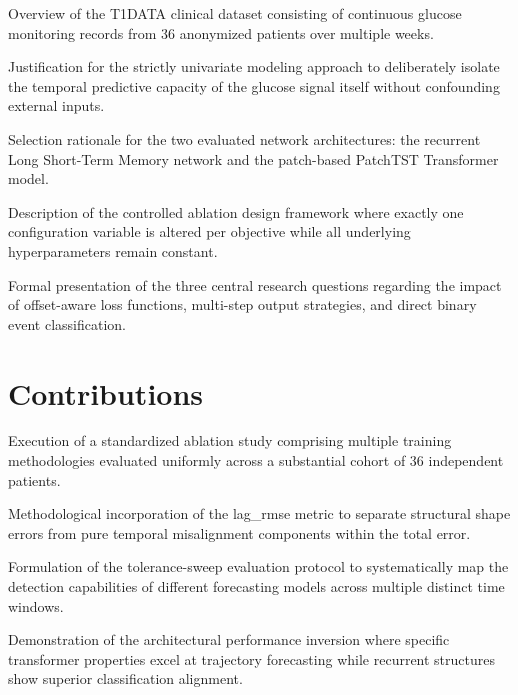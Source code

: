 \begin{planned}
    \item Overview of the T1DATA clinical dataset consisting of continuous glucose monitoring records from 36 anonymized patients over multiple weeks.
    \item Justification for the strictly univariate modeling approach to deliberately isolate the temporal predictive capacity of the glucose signal itself without confounding external inputs.
    \item Selection rationale for the two evaluated network architectures: the recurrent Long Short-Term Memory network and the patch-based PatchTST Transformer model.
    \item Description of the controlled ablation design framework where exactly one configuration variable is altered per objective while all underlying hyperparameters remain constant.
    \item Formal presentation of the three central research questions regarding the impact of offset-aware loss functions, multi-step output strategies, and direct binary event classification.
\end{planned}

\section{Contributions}
\label{sec:intro:contributions}

\begin{planned}
    \item Execution of a standardized ablation study comprising multiple training methodologies evaluated uniformly across a substantial cohort of 36 independent patients.
    \item Methodological incorporation of the lag\_rmse metric to separate structural shape errors from pure temporal misalignment components within the total error.
    \item Formulation of the tolerance-sweep evaluation protocol to systematically map the detection capabilities of different forecasting models across multiple distinct time windows.
    \item Demonstration of the architectural performance inversion where specific transformer properties excel at trajectory forecasting while recurrent structures show superior classification alignment.
\end{planned}

